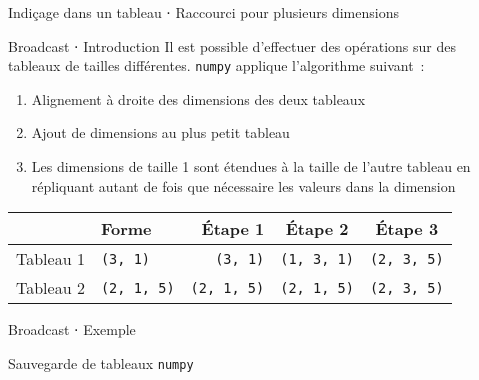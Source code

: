 \begin{frame}{Indiçage dans un tableau ⋅ Raccourci pour plusieurs dimensions}
\end{frame}


\begin{frame}{Broadcast ⋅ Introduction}
  Il est possible d'effectuer des opérations sur des tableaux de tailles différentes.
  \texttt{numpy} applique l'algorithme suivant~:
  \begin{enumerate}
    \item Alignement à droite des dimensions des deux tableaux
    \item Ajout de dimensions au plus petit tableau
    \item Les dimensions de taille 1 sont étendues à la taille de l'autre tableau en répliquant autant de fois que nécessaire les valeurs dans la dimension
  \end{enumerate}
  \begin{tabular}{clrcc}
    \toprule
    & Forme & Étape 1 & Étape 2 & Étape 3 \\
    \midrule
    Tableau 1 & \texttt{(3, 1)} & \texttt{(3, 1)} & \texttt{(1, 3, 1)} & \texttt{(2, 3, 5)} \\
    Tableau 2 & \texttt{(2, 1, 5)} & \texttt{(2, 1, 5)} & \texttt{(2, 1, 5)} & \texttt{(2, 3, 5)} \\
    \bottomrule
  \end{tabular}
\end{frame}

\begin{frame}{Broadcast ⋅ Exemple}
\end{frame}

\begin{frame}{Sauvegarde de tableaux \texttt{numpy}}
\end{frame}
